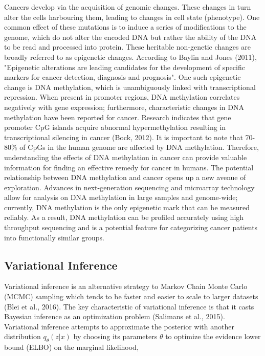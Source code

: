 \documentclass{article}
\begin{document}
Cancers develop via the acquisition of genomic changes. These changes in turn alter the cells harbouring them, leading to changes in cell state (phenotype). One common effect of these mutations is to induce a series of modifications to the genome, which do not alter the encoded DNA but rather the ability of the DNA to be read and processed into protein. These heritable non-genetic changes are broadly referred to as epigenetic changes. According to Baylin and Jones (2011), "Epigenetic alterations are leading candidates for the development of specific markers for cancer detection, diagnosis and prognosis". One such epigenetic change is DNA methylation, which is unambiguously linked with transcriptional repression. When present in promoter regions, DNA methylation correlates negatively with gene expression; furthermore, characteristic changes in DNA methylation have been reported for cancer. Research indicates that gene promoter CpG islands acquire abnormal hypermethylation resulting in transcriptional silencing in cancer (Bock, 2012). It is important to note that 70-80\% of CpGs in the human genome are affected by DNA methylation. Therefore, understanding the effects of DNA methylation in cancer can provide valuable information for finding an effective remedy for cancer in humans. The potential relationship between DNA methylation and cancer opens up a new avenue of exploration. Advances in next-generation sequencing and microarray technology allow for analysis on DNA methylation in large samples and genome-wide; currently, DNA methylation is the only epigenetic mark that can be measured reliably. As a result, DNA methylation can be profiled accurately using high throughput sequencing and is a potential feature for categorizing cancer patients into functionally similar groups. 


\subsection{Variational Inference}

Variational inference is an alternative strategy to Markov Chain Monte Carlo (MCMC) sampling which tends to be faster and easier to scale to larger datasets (Blei et al., 2016). The key characteristic of variational inference is that it casts Bayesian inference as an optimization problem (Salimans et al., 2015). Variational inference attempts to approximate the posterior with another distribution $q_\theta(z|x)$ by choosing its parameters $\theta$ to optimize the evidence lower bound (ELBO) on the marginal likelihood,
\end{document}
